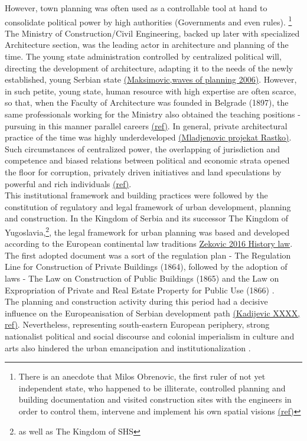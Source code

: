 \documentclass[11pt]{report}
\begin{document}
However, town planning was often used as a controllable tool at hand to consolidate political power by high authorities (Governments and even rules). \footnote{There is an anecdote that Milos Obrenovic, the first ruler of not yet independent state, who happened to be illiterate, controlled planning and building documentation and visited construction sites with the engineers in order to control them, intervene and implement his own spatial visions \href{ref}{(ref)}}
The Ministry of Construction/Civil Engineering, backed up later with specialized Architecture section, was the leading actor in architecture and planning of the time. The young state administration controlled by centralized political will, directing the development of architecture, adapting it to the needs of the newly established, young Serbian state \href{ref}{(Maksimovic,waves of planning 2006)}. However, in such petite, young state, human resource with high expertise are often scarce, so that, when the Faculty of Architecture was founded in Belgrade (1897), the same professionals working for the Ministry also obtained the teaching positions - pursuing in this manner parallel careers \href{ref}{(ref)}. In general, private architectural practice of the time was highly underdeveloped \href{ref}{(Mladjenovic projekat Rastko)}. Such circumstances of centralized power, the overlapping of jurisdiction and competence and biased relations between political and economic strata opened the floor for corruption, privately driven initiatives and land speculations by powerful and rich individuals \href{ref}{(ref)}.
\\

This institutional framework and building practices were followed by the constitution of regulatory and legal framework of urban development, planning and construction.
In the Kingdom of Serbia and its successor The Kingdom of Yugoslavia,\footnote{as well as The Kingdom of SHS}, the legal framework for urban planning was based and developed according to the European continental law traditions \href{ref}{Zekovic 2016 History law}.
The first adopted document was a sort of the regulation plan - The Regulation  Line  for  Construction  of  Private  Buildings (1864), followed by the adoption of laws - The Law on Construction of Public Buildings (1865) and the Law on Expropriation of Private and Real Estate Property for Public Use (1866) \href{ref}{\citealt{nedovicbudic_waves_2006}}.
\\

The planning and construction activity during this period had a decisive influence on the Europeanisation of Serbian development path \href{ref}{(Kadijevic XXXX, ref)}. Nevertheless, representing south-eastern European periphery, strong nationalist political and social discourse and colonial imperialism in culture and arts also hindered the urban emancipation and institutionalization \href{ref}{\citealt{vukmirovic_city_2013}}.
\\
\end{document}
